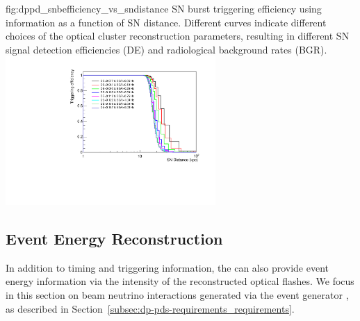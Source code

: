 \begin{dunefigure}{fig:dppd_snbefficiency_vs_sndistance}
     {SN burst triggering efficiency using   information as a function of SN distance. Different curves indicate different choices of the optical cluster reconstruction parameters, resulting in different SN \nue signal detection efficiencies (DE) and radiological background rates (BGR).}
    \includegraphics[width=0.6\textwidth]{graphics/dppd_snbefficiency_vs_sndistance.pdf}
    \end{dunefigure}



\subsection{Event Energy Reconstruction}
\label{subsec:dp-pds-performance_calorimetry}

In addition to timing and triggering information, the  can also provide event energy information via the intensity of the reconstructed optical flashes. We focus in this section on beam neutrino interactions generated via the  event generator \cite{Andreopoulos:2009rq}, as described in Section~\ref{subsec:dp-pds-requirements_requirements}.

